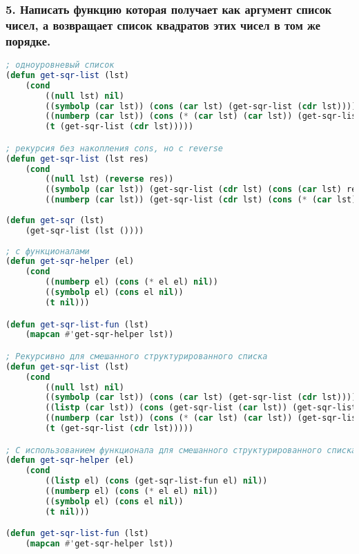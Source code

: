 \subsubsection*{5. Написать функцию которая получает как аргумент список чисел, а возвращает список квадратов этих чисел в том же порядке.}
\begin{lstlisting}[language=Lisp]
; одноуровневый список
(defun get-sqr-list (lst)
	(cond 
		((null lst) nil)
		((symbolp (car lst)) (cons (car lst) (get-sqr-list (cdr lst))))
		((numberp (car lst)) (cons (* (car lst) (car lst)) (get-sqr-list (cdr lst))))
		(t (get-sqr-list (cdr lst)))))

; рекурсия без накопления cons, но с reverse
(defun get-sqr-list (lst res)
	(cond 
		((null lst) (reverse res))
		((symbolp (car lst)) (get-sqr-list (cdr lst) (cons (car lst) res)))
		((numberp (car lst)) (get-sqr-list (cdr lst) (cons (* (car lst) (car lst)) res)))))
		
(defun get-sqr (lst)
	(get-sqr-list (lst ())))
	
; c функционалами
(defun get-sqr-helper (el)
	(cond
		((numberp el) (cons (* el el) nil))
		((symbolp el) (cons el nil))
		(t nil)))

(defun get-sqr-list-fun (lst)
	(mapcan #'get-sqr-helper lst))

; Рекурсивно для смешанного структурированного списка 
(defun get-sqr-list (lst)
	(cond 
		((null lst) nil)
		((symbolp (car lst)) (cons (car lst) (get-sqr-list (cdr lst))))
		((listp (car lst)) (cons (get-sqr-list (car lst)) (get-sqr-list (cdr lst))))
		((numberp (car lst)) (cons (* (car lst) (car lst)) (get-sqr-list (cdr lst))))
		(t (get-sqr-list (cdr lst)))))

; С использованием функционала для смешанного структурированного списка
(defun get-sqr-helper (el)
	(cond
		((listp el) (cons (get-sqr-list-fun el) nil))
		((numberp el) (cons (* el el) nil))
		((symbolp el) (cons el nil))
		(t nil)))

(defun get-sqr-list-fun (lst)
	(mapcan #'get-sqr-helper lst))
\end{lstlisting}

\newpage
